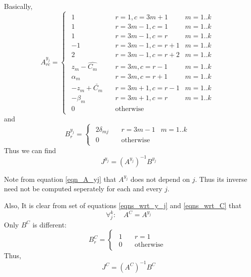 \documentclass[11 pt]{article}
\begin{document}
Basically,
\begin{equation} \label{eqn_A_yj}
    A_{rc}^{y_j} = \begin{cases}
        \begin{aligned}
            1 &\quad    r=1,c=3m+1 & m=1..k \\
            1 &\quad    r=3m-1,c=1 & m=1..k \\
            1 &\quad    r=3m-1,c=r & m=1..k \\
            -1 &\quad   r=3m-1,c=r+1 & m=1..k \\
            2 &\quad    r=3m-1,c=r+2 & m=1..k \\
            z_m-\hat{C_m} &\quad    r=3m,c=r-1 & m=1..k \\
            \alpha_m &\quad r=3m,c=r+1 & m=1..k \\
            -z_m+\check{C_m} &\quad  r=3m+1,c=r-1 & m=1..k \\
            -\beta_m &\quad r=3m+1,c=r & m=1..k \\
            0 &\quad \text{otherwise}
        \end{aligned}
    \end{cases}
\end{equation}
and
\begin{equation} \label{eqn_B_yj}
    B_r^{y_j} = \begin{cases}
        \begin{aligned}
            2 \delta_{mj} &\quad r=3m-1 & m=1..k \\
            0 &\quad \text{otherwise}
        \end{aligned}
    \end{cases}
\end{equation}
Thus we can find
\begin{equation}
    J^{y_j} = (A^{y_j})^{-1} B^{y_j}
\end{equation}

Note from equation \ref{eqn_A_yj} that $A^{y_j}$ does not depend on $j$. Thus its inverse need not be computed seperately for each and every $j$.

Also, It is clear from set of equations \ref{eqns_wrt_y_j} and \ref{eqns_wrt_C} that
\begin{equation}\label{eqn_all_A_same}
    \forall_j^k:\quad A^C = A^{y_j}
\end{equation}
Only $B^C$ is different:
\begin{equation}
    B_r^C = \begin{cases}
        \begin{aligned}
            1 &\quad r=1 \\
            0 &\quad \text{otherwise}
        \end{aligned}
    \end{cases}
\end{equation}
Thus,
\begin{equation}
    J^{C} = (A^C)^{-1} B^{C}
\end{equation}
\end{document}
